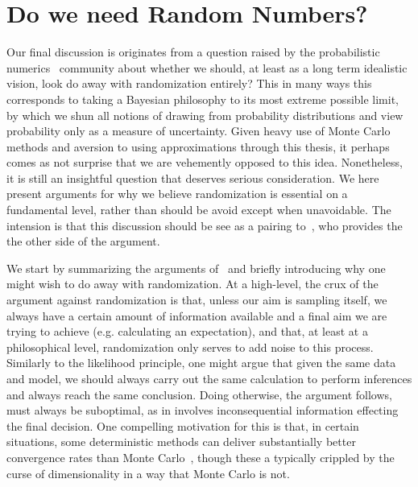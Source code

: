 \section{Do we need Random Numbers?}
	
Our final discussion is originates from a question raised by the probabilistic numerics~\citep{hennig2015probabilistic}
community about whether we should, at least as a long term idealistic vision, look do away with randomization entirely?  This
in many ways this corresponds to taking a Bayesian philosophy to its most extreme possible
limit, by which we shun all notions of drawing from probability distributions and view probability only as a measure
of uncertainty.  Given heavy use of Monte Carlo methods and aversion to using approximations through this thesis,
it perhaps comes as not surprise that we are vehemently opposed to this idea.  Nonetheless, it is still an insightful
question that deserves serious consideration.  We here present arguments for why we believe randomization is essential
on a fundamental level, rather than should be avoid except when unavoidable.  The intension is that this discussion should
be see as a pairing to~\citep{schober2017thesis}, who provides the the other side of the argument.

We start by summarizing the arguments of~\citep{schober2017thesis} and briefly introducing why one might wish to
do away with randomization.  At a high-level, the crux of the argument against randomization is that, unless our aim 
is sampling itself, we always have a certain amount of information available and a final aim we are trying to achieve (e.g.
calculating an expectation), and that, at least at a philosophical level, randomization only serves to add noise to this
process.  Similarly to the likelihood principle, one might argue that given the same data and model, we should 
always carry out the same calculation to perform inferences and always reach the same conclusion.  Doing otherwise,
the argument follows, must always be suboptimal, as in involves inconsequential information effecting the final
decision.  One compelling motivation for this is that, in certain situations, some deterministic
methods can deliver substantially better convergence rates than Monte Carlo~\cite{briol2016fwbq,caflisch1998monte}, 
though these a typically crippled by the curse of dimensionality in a way that Monte Carlo is not.
	
